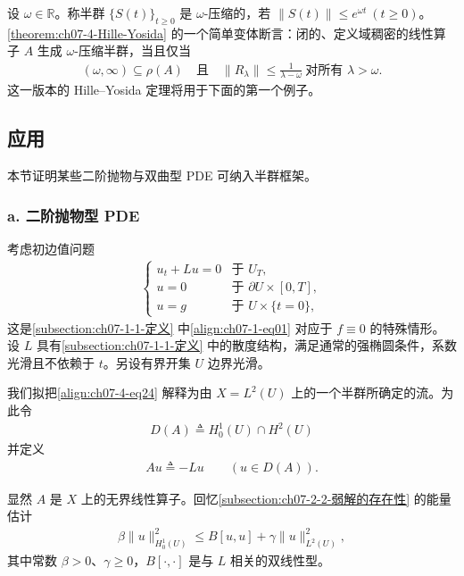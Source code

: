 \documentclass[../../main.tex]{subfiles}
\begin{document}
\begin{remark}\label{remark:ch07-4-omega压缩半群}
设 $\omega\in\mathbb{R}$。称半群 $\{S(t)\}_{t\geqslant 0}$ 是 $\omega$-压缩的，若 $\|S(t)\|\leqslant e^{\omega t}\ (t\geqslant 0)$。\cref{theorem:ch07-4-Hille-Yosida} 的一个简单变体断言：闭的、定义域稠密的线性算子 $A$ 生成 $\omega$-压缩半群，当且仅当
\begin{align}
(\omega,\infty)\subseteq\rho(A)\quad\text{且}\quad \|R_\lambda\|\leqslant\frac{1}{\lambda-\omega}\ \text{对所有 }\lambda>\omega.\label{align:ch07-4-eq23}
\end{align}
这一版本的 Hille--Yosida 定理将用于下面的第一个例子。
\end{remark}

\subsection{应用}\label{subsection:ch07-4-3-应用}

本节证明某些二阶抛物与双曲型 PDE 可纳入半群框架。

\subsubsection*{a. 二阶抛物型 PDE}

考虑初边值问题
\begin{align}
\begin{cases}
u_t+Lu=0 & \text{于 } U_T,\\
u=0 & \text{于 } \partial U\times[0,T],\\
u=g & \text{于 } U\times\{t=0\},
\end{cases}\label{align:ch07-4-eq24}
\end{align}
这是\cref{subsection:ch07-1-1-定义} 中\eqref{align:ch07-1-eq01} 对应于 $f\equiv 0$ 的特殊情形。设 $L$ 具有\cref{subsection:ch07-1-1-定义} 中的散度结构，满足通常的强椭圆条件，系数光滑且不依赖于 $t$。另设有界开集 $U$ 边界光滑。

我们拟把\eqref{align:ch07-4-eq24} 解释为由 $X=L^2(U)$ 上的一个半群所确定的流。为此令
\begin{align}
D(A)\triangleq H^1_0(U)\cap H^2(U)\label{align:ch07-4-eq25}
\end{align}
并定义
\begin{align}
Au\triangleq -Lu\qquad (u\in D(A)).\label{align:ch07-4-eq26}
\end{align}

显然 $A$ 是 $X$ 上的无界线性算子。回忆\cref{subsection:ch07-2-2-弱解的存在性} 的能量估计
\begin{align}
\beta\|u\|_{H^1_0(U)}^2\leqslant B[u,u]+\gamma\|u\|_{L^2(U)}^2,\label{align:ch07-4-eq27}
\end{align}
其中常数 $\beta>0$、$\gamma\geqslant 0$，$B[\cdot,\cdot]$ 是与 $L$ 相关的双线性型。
\end{document}
